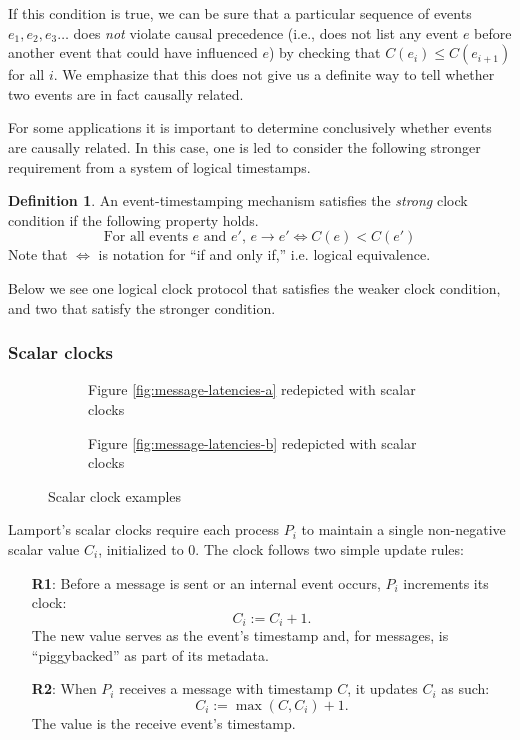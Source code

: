 \documentclass[]             %
{NASA}                       %
\theoremstyle{definition}
\newtheorem{definition}[theorem]{Definition}
\begin{document}
If this condition is true, we can be sure that a particular sequence
of events $e_1, e_2, e_3\ldots$ does \emph{not} violate causal
precedence (i.e., does not list any event $e$ before another event
that could have influenced $e$) by checking that
$C(e_{i}) \leq C(e_{i+1})$ for all $i$. We emphasize that this does
not give us a definite way to tell whether two events are in fact
causally related.

For some applications it is important to determine conclusively
whether events are causally related. In this case, one is led to
consider the following stronger requirement from a system of logical
timestamps.
\begin{definition}
  An event-timestamping mechanism satisfies the \emph{strong} clock   condition if the following property holds.
  \[ \textrm{For all events $e$ and $e'$, } e \to e' \iff C(e) < C(e') \label{eq:sc}\tag{SC} \]
  Note that $\iff$ is notation for ``if and only if,'' i.e. logical equivalence.
\end{definition}
Below we see one logical clock protocol that satisfies the weaker
clock condition, and two that satisfy the stronger condition.

\subsubsection{Scalar clocks}
\label{sssec:scalar-clocks}
\begin{figure}
  \setlength\belowcaptionskip{5ex}

  \begin{subfigure}{1\textwidth}
    \centering 
    \caption{Figure \ref{fig:message-latencies-a} redepicted with scalar clocks}
    \label{fig:message-latencies-scalar-a}
  \end{subfigure}

  \begin{subfigure}{1\textwidth}
    \centering 
    \caption{Figure \ref{fig:message-latencies-b} redepicted with scalar clocks}
    \label{fig:message-latencies-scalar-b}
  \end{subfigure}

  \caption{Scalar clock examples}
  \label{fig:message-latencies-scalar}
\end{figure}

Lamport's scalar clocks \cite{1978:lamportclocks} require each
process $P_i$ to maintain a single non-negative scalar value $C_i$,
initialized to $0$. The clock follows two simple update rules:
\begin{enumerate}
\item[\textbf{R1}:] Before a message is sent or an internal event occurs, $P_i$
  increments its clock:
  \[C_i := C_i + 1.\]
  The new value serves as the event's timestamp and, for messages, is ``piggybacked''
  as part of its metadata.
\item[\textbf{R2}:] When $P_i$ receives a message with timestamp $C$, it
  updates $C_i$ as such:
  \[C_i := \max(C, C_i) + 1.\]
  The value is the receive event's timestamp.
\end{enumerate}
\end{document}
